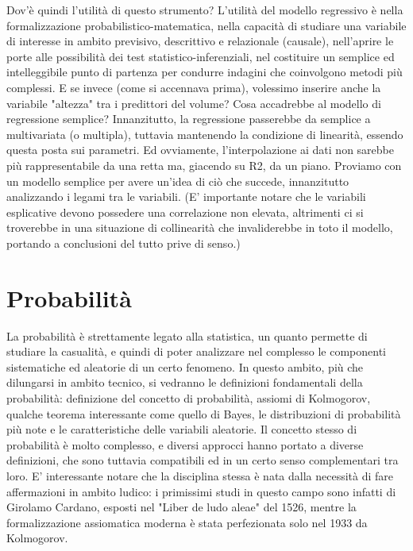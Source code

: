 \documentclass[a4paper]{article}
\begin{document}


Dov'\`{e} quindi l'utilit\`{a} di questo strumento? L'utilit\`{a} del modello regressivo \`{e} nella formalizzazione probabilistico-matematica, nella capacit\`{a} di studiare una variabile di interesse in ambito previsivo, descrittivo e relazionale (causale), nell'aprire le porte alle possibilit\`{a} dei test statistico-inferenziali, nel costituire un semplice ed intelleggibile punto di partenza per condurre indagini che coinvolgono metodi più complessi.
E se invece (come si accennava prima), volessimo inserire anche la variabile "altezza" tra i predittori del volume? Cosa accadrebbe al modello di regressione semplice?
Innanzitutto, la regressione passerebbe da semplice a multivariata (o multipla), tuttavia mantenendo la condizione di linearit\`{a}, essendo questa posta sui parametri. Ed ovviamente, l'interpolazione ai dati non sarebbe più rappresentabile da una retta ma, giacendo su R2, da un piano.
Proviamo con un modello semplice per avere un'idea di ciò che succede, innanzitutto analizzando i legami tra le variabili. (E' importante notare che le variabili esplicative devono possedere una correlazione non elevata, altrimenti ci si troverebbe in una situazione di collinearit\`{a} che invaliderebbe in toto il modello, portando a conclusioni del tutto prive di senso.)



\section{Probabilit\`{a}}

La probabilit\`{a} \`{e} strettamente legato alla statistica, un quanto permette di studiare la casualit\`{a}, e quindi di poter analizzare nel complesso le componenti sistematiche ed aleatorie di un certo fenomeno. In questo ambito, più che dilungarsi in ambito tecnico, si vedranno le definizioni fondamentali della probabilit\`{a}: definizione del concetto di probabilit\`{a}, assiomi di Kolmogorov, qualche teorema interessante come quello di Bayes, le distribuzioni di probabilit\`{a} più note e le caratteristiche delle variabili aleatorie.
Il concetto stesso di probabilit\`{a} \`{e} molto complesso, e diversi approcci hanno portato a diverse definizioni, che sono tuttavia compatibili ed in un certo senso complementari tra loro. E' interessante notare che la disciplina stessa \`{e} nata dalla necessit\`{a} di fare affermazioni in ambito ludico: i primissimi studi in questo campo sono infatti di Girolamo Cardano, esposti nel "Liber de ludo aleae" del 1526, mentre la formalizzazione assiomatica moderna \`{e} stata perfezionata solo nel 1933 da Kolmogorov.
\end{document}

